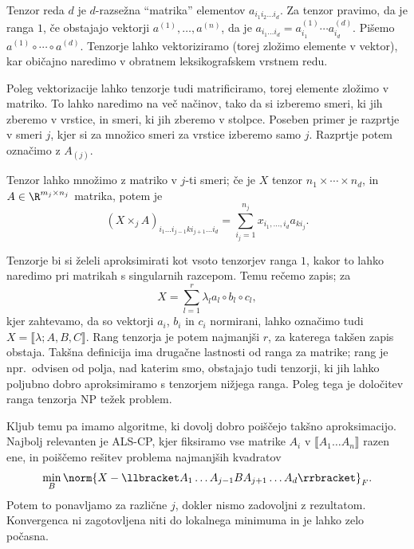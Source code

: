 
Tenzor reda $d$ je $d$-razsežna \enquote{matrika} elementov $a_{i_1 i_2 \ldots
  i_d}$.
Za tenzor pravimo, da je ranga $1$, če obstajajo vektorji $a^{(1)}, \ldots,
a^{(n)}$, da je $a_{i_1 \ldots i_d} = a^{(1)}_{i_1} \cdots a^{(d)}_{i_d}$.
Pišemo $a^{(1)} \circ \cdots \circ a^{(d)}$.
Tenzorje lahko vektoriziramo (torej zložimo elemente v vektor), kar običajno
naredimo v obratnem leksikografskem vrstnem redu.

Poleg vektorizacije lahko tenzorje tudi matrificiramo, torej elemente zložimo v
matriko.
To lahko naredimo na več načinov, tako da si izberemo smeri, ki jih zberemo v
vrstice, in smeri, ki jih zberemo v stolpce.
Poseben primer je razprtje v smeri $j$, kjer si za množico smeri za vrstice
izberemo samo $j$.
Razprtje potem označimo z $A_{(j)}$.


Tenzor lahko množimo z matriko v $j$-ti smeri; če je $X$ tenzor $n_1 \times
\cdots \times n_d$, in $A \in \R^{m_j \times n_j}$ matrika, potem je
\[
  (X \times_j A)_{i_1 \ldots i_{j-1} k i_{j+1} \ldots i_d}
  = \sum_{i_j=1}^{n_j} x_{i_1, \ldots, i_d} a_{k i_j}.
\]

Tenzorje bi si želeli aproksimirati kot vsoto tenzorjev ranga $1$, kakor to
lahko naredimo pri matrikah s singularnih razcepom.
Temu rečemo  zapis; za
\[
  X = \sum_{l=1}^r \lambda_l a_l \circ b_l \circ c_l,
\]
kjer zahtevamo, da so vektorji $a_i$, $b_i$ in $c_i$ normirani, lahko označimo
tudi $X = \llbracket \lambda; A, B, C \rrbracket$.
Rang tenzorja je potem najmanjši $r$, za katerega takšen zapis obstaja.
Takšna definicija ima drugačne lastnosti od ranga za matrike; rang je
npr.~odvisen od polja, nad katerim smo, obstajajo tudi tenzorji, ki jih lahko
poljubno dobro aproksimiramo s tenzorjem nižjega ranga.
Poleg tega je določitev ranga tenzorja NP težek problem.

Kljub temu pa imamo algoritme, ki dovolj dobro poiščejo takšno aproksimacijo.
Najbolj relevanten je ALS-CP, kjer fiksiramo vse matrike $A_i$ v $\llbracket A_1
\ldots A_n \rrbracket$ razen ene, in poiščemo rešitev problema najmanjših
kvadratov
\[
  \min_B \norm{X - \llbracket A_1 \ldots A_{j-1} B A_{j+1} \ldots A_d \rrbracket}_F.
\]
Potem to ponavljamo za različne $j$, dokler nismo zadovoljni z rezultatom.
Konvergenca ni zagotovljena niti do lokalnega minimuma in je lahko zelo počasna.


